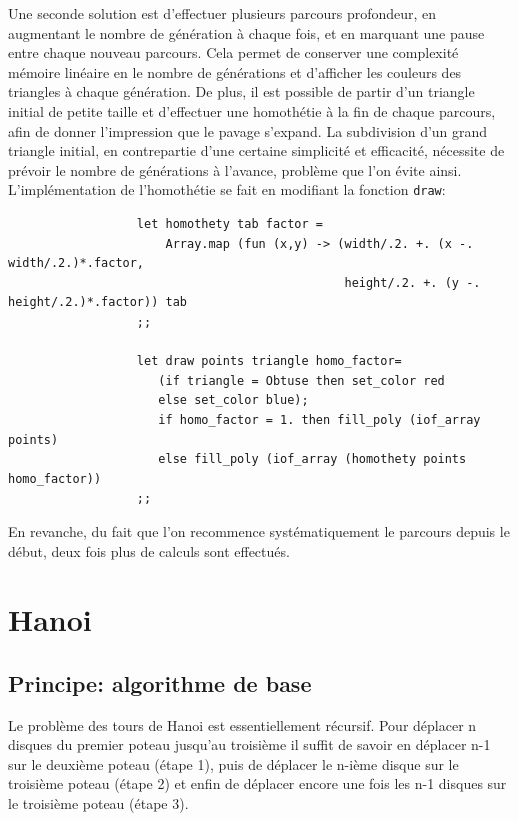 \documentclass[a4paper, 11pt]{article}%
\begin{document}
                Une seconde solution est d'effectuer plusieurs
                parcours profondeur, en augmentant le nombre de
                génération à chaque fois, et en marquant une pause
                entre chaque nouveau parcours. Cela permet de
                conserver une complexité mémoire linéaire en le nombre
                de générations et d'afficher les couleurs des triangles
                à chaque génération. De plus, il est possible de
                partir d'un triangle initial de petite taille et 
                d'effectuer une homothétie à la fin de chaque
                parcours, afin de donner l'impression que le pavage
                s'expand. La subdivision d'un grand triangle initial, en
                contrepartie d'une certaine simplicité et efficacité,
                nécessite de prévoir le nombre de générations à
                l'avance, problème que l'on évite
                ainsi. L'implémentation de l'homothétie se fait en
                modifiant la fonction \texttt{draw}:
                \begin{lstlisting}
                  let homothety tab factor = 
                      Array.map (fun (x,y) -> (width/.2. +. (x -. width/.2.)*.factor, 
                                               height/.2. +. (y -. height/.2.)*.factor)) tab
                  ;;
  
                  let draw points triangle homo_factor=
                     (if triangle = Obtuse then set_color red
                     else set_color blue);
                     if homo_factor = 1. then fill_poly (iof_array points)
                     else fill_poly (iof_array (homothety points homo_factor))
                  ;;

                \end{lstlisting}

                En revanche, du fait que l'on recommence
                systématiquement le parcours depuis le début, deux
                fois plus de calculs sont effectués.

\section{Hanoi}

	\subsection{Principe: algorithme de base}
		Le problème des tours de Hanoi est essentiellement récursif. Pour
		déplacer n disques du premier poteau jusqu'au troisième
		il suffit de savoir en déplacer n-1 sur le deuxième poteau (étape 1), puis
		de déplacer le n-ième disque sur le troisième poteau (étape 2) et enfin de
		déplacer encore une fois les n-1 disques sur le troisième poteau (étape 3).
\end{document}
